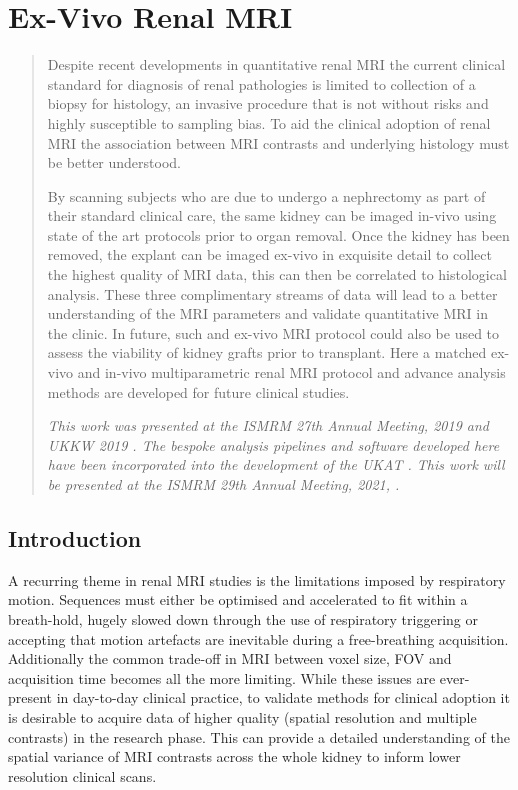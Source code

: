 \chapter{Ex-Vivo Renal MRI}
\label{chap:ex}
\newpage
\begin{abstract}
	Despite recent developments in quantitative renal \ac{MRI} the current clinical standard for diagnosis of renal pathologies is limited to collection of a  biopsy for histology, an invasive procedure that is not without risks and highly susceptible to sampling bias. To aid the clinical adoption of renal \ac{MRI} the association between \ac{MRI} contrasts and underlying histology must be better understood.	
	
	By scanning subjects who are due to undergo a nephrectomy as part of their standard clinical care, the same kidney can be imaged in-vivo using state of the art protocols prior to organ removal. Once the kidney has been removed, the explant can be imaged ex-vivo in exquisite detail to collect the highest quality of \ac{MRI} data, this can then be correlated to  histological analysis. These three complimentary streams of data will lead to a better understanding of the \ac{MRI} parameters and validate quantitative \ac{MRI} in the clinic. In future, such and ex-vivo \ac{MRI} protocol could also be used to assess the viability of kidney grafts prior to transplant. Here a matched ex-vivo and in-vivo multiparametric renal \ac{MRI} protocol and advance analysis methods are developed for future clinical studies.
	
	\textit{This work was presented at the \ac{ISMRM} 27th Annual Meeting, 2019 \cite{daniel_effects_2019} and \ac{UKKW} 2019 \cite{kazmi_determining_2019-1}. The bespoke analysis pipelines and software developed here have been incorporated into the development of the \ac{UKAT} \cite{nery_ukrin_2020}. This work will be presented at the \ac{ISMRM} 29th Annual Meeting, 2021, \cite{daniel_ukrin_2021}.}
\end{abstract}
\acresetall
\newpage
\section{Introduction}

A recurring theme in renal \ac{MRI} studies is the limitations imposed by respiratory motion. Sequences must either be optimised and accelerated to fit within a breath-hold, hugely slowed down through the use of respiratory triggering or accepting that motion artefacts are inevitable during a free-breathing acquisition. Additionally the common trade-off in \ac{MRI} between voxel size, \ac{FOV} and acquisition time becomes all the more limiting. While these issues are ever-present in day-to-day clinical practice, to validate methods for clinical adoption it is desirable to acquire data of higher quality (spatial resolution and multiple contrasts) in the research phase. This can provide a detailed understanding of the spatial variance of \ac{MRI} contrasts across the whole kidney to inform lower resolution clinical scans.

